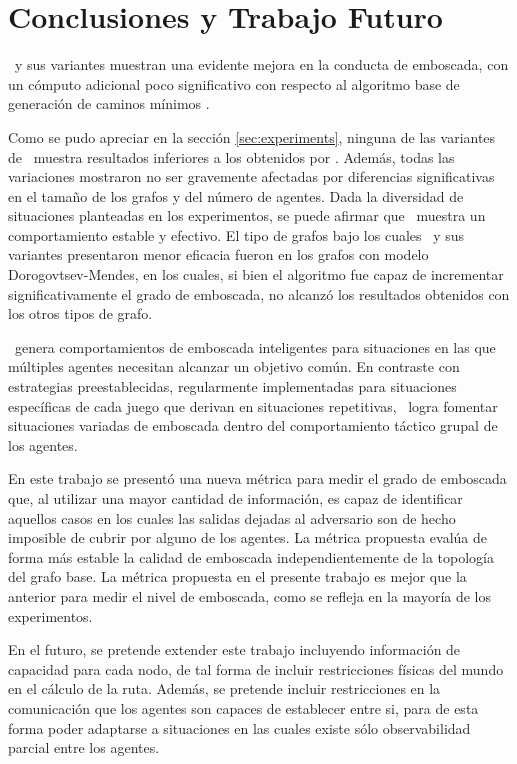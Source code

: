 \section{Conclusiones y Trabajo Futuro}
\label{sec:conclusions}

\ambush\ y sus variantes muestran una evidente mejora en la conducta de
emboscada, con un c\'omputo adicional poco significativo con respecto
al algoritmo base de generaci\'on de caminos m\'inimos \astar.

Como se pudo apreciar en la secci\'on \ref{sec:experiments}, ninguna
de las variantes de \ambush\ muestra resultados inferiores a los obtenidos
por \astar. Adem\'as, todas las variaciones mostraron no ser gravemente
afectadas por diferencias significativas en el tamaño de los grafos y
del n\'umero de agentes. Dada la diversidad de situaciones planteadas
en los experimentos, se puede afirmar que \ambush\ muestra un comportamiento
estable y efectivo. El tipo de grafos bajo los cuales \ambush\ y sus
variantes presentaron menor eficacia fueron en los grafos con modelo
Dorogovtsev-Mendes, en los cuales, si bien el algoritmo fue capaz de
incrementar significativamente el grado de emboscada, no alcanz\'o
los resultados obtenidos con los otros tipos de grafo.

\ambush\ genera comportamientos de emboscada inteligentes para situaciones
en las que múltiples agentes necesitan alcanzar un objetivo común. En
contraste con estrategias preestablecidas, regularmente implementadas para
situaciones específicas de cada juego que derivan en situaciones repetitivas,
\ambush\ logra fomentar situaciones va\-ria\-das de emboscada dentro del 
comportamiento táctico grupal de los agentes.

En este trabajo se present\'o una nueva m\'etrica para medir el grado de
emboscada que, al utilizar una mayor cantidad de informaci\'on, es capaz
de identificar aquellos casos en los cuales las salidas dejadas al
adversario son de hecho imposible de cubrir por alguno de los agentes.
La m\'etrica propuesta eval\'ua de forma m\'as estable la ca\-li\-dad de
emboscada independientemente de la topolog\'ia del grafo base.
La métrica propuesta en el presente trabajo es mejor que la anterior
para medir el nivel de emboscada, como se refleja en la mayoría de
los experimentos.

En el futuro, se pretende extender este trabajo incluyendo informaci\'on
de capacidad para cada nodo, de tal forma de incluir restricciones
f\'isicas del mundo en el c\'alculo de la ruta. Adem\'as, se pretende
incluir restricciones en la comunicaci\'on que los agentes son capaces
de establecer entre si, para de esta forma poder adaptarse a situaciones
en las cuales existe s\'olo observabilidad parcial entre los agentes.
